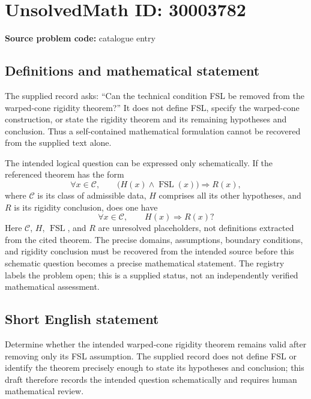 \documentclass[11pt]{article}
\begin{document}
\section*{UnsolvedMath ID: 30003782}
\textbf{Source problem code:} catalogue entry
\subsection{Definitions and mathematical statement}
The supplied record asks: ``Can the technical condition FSL be removed from the warped-cone rigidity theorem?'' It does not define FSL, specify the warped-cone construction, or state the rigidity theorem and its remaining hypotheses and conclusion. Thus a self-contained mathematical formulation cannot be recovered from the supplied text alone.

The intended logical question can be expressed only schematically. If the referenced theorem has the form
\[
\forall x\in\mathcal C,\qquad
\bigl(H(x)\land\operatorname{FSL}(x)\bigr)\Longrightarrow R(x),
\]
where \(\mathcal C\) is its class of admissible data, \(H\) comprises all its other hypotheses, and \(R\) is its rigidity conclusion, does one have
\[
\forall x\in\mathcal C,\qquad H(x)\Longrightarrow R(x)?
\]
Here \(\mathcal C\), \(H\), \(\operatorname{FSL}\), and \(R\) are unresolved placeholders, not definitions extracted from the cited theorem. The precise domains, assumptions, boundary conditions, and rigidity conclusion must be recovered from the intended source before this schematic question becomes a precise mathematical statement. The registry labels the problem open; this is a supplied status, not an independently verified mathematical assessment.
\subsection{Short English statement}
Determine whether the intended warped-cone rigidity theorem remains valid after removing only its FSL assumption. The supplied record does not define FSL or identify the theorem precisely enough to state its hypotheses and conclusion; this draft therefore records the intended question schematically and requires human mathematical review.
\end{document}
